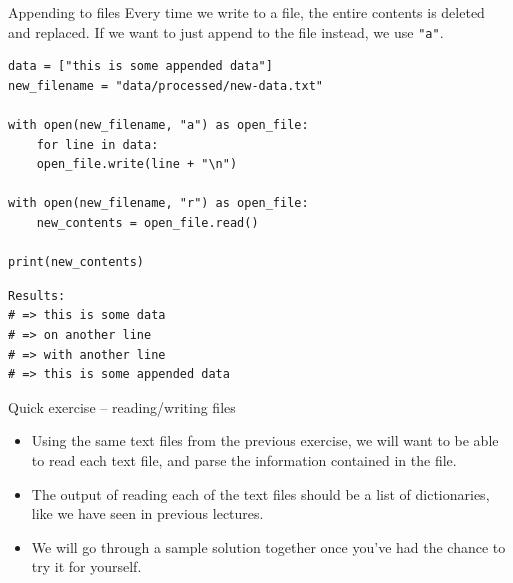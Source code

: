 \documentclass[10pt]{beamer}
\begin{document}
\begin{frame}[label={sec:orgf5996e0},fragile]{Appending to files}
 Every time we write to a file, the entire contents is deleted and replaced. If we
want to just append to the file instead, we use \texttt{"a"}.

\begin{verbatim}
data = ["this is some appended data"]
new_filename = "data/processed/new-data.txt"

with open(new_filename, "a") as open_file:
    for line in data:
	open_file.write(line + "\n")

with open(new_filename, "r") as open_file:
    new_contents = open_file.read()

print(new_contents)
\end{verbatim}

\begin{verbatim}
Results: 
# => this is some data
# => on another line
# => with another line
# => this is some appended data
\end{verbatim}
\end{frame}

\begin{frame}[label={sec:org6ba297a}]{Quick exercise -- reading/writing files}
\begin{itemize}
\item Using the same text files from the previous exercise, we will want to be able to
read each text file, and parse the information contained in the file.
\item The output of reading each of the text files should be a list of dictionaries, like
we have seen in previous lectures.
\item We will go through a sample solution together once you've had the chance to try it
for yourself.
\end{itemize}
\end{frame}
\end{document}
